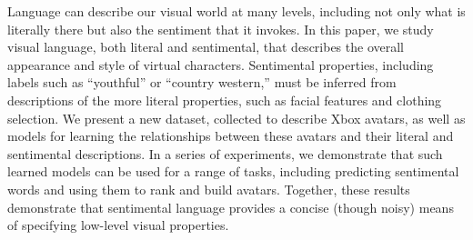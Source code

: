 Language can describe our visual world at many levels, including not only what is literally there but also the sentiment that it invokes. In this paper, we
 study visual language, both literal and sentimental, that describes the overall
 appearance and style of virtual characters. Sentimental properties, including
 labels such as ``youthful'' or ``country western,'' must be inferred from
 descriptions of the more literal properties, such as facial features and
 clothing selection. We present a new dataset, collected to describe Xbox
 avatars, as well as models for learning the relationships between these avatars
 and their literal and sentimental descriptions. In a series of experiments, we
 demonstrate that such learned models can be used for a range of tasks,
 including predicting sentimental words and using them to rank and build
 avatars. Together, these results demonstrate that sentimental language provides
 a concise (though noisy) means of specifying low-level visual properties.

